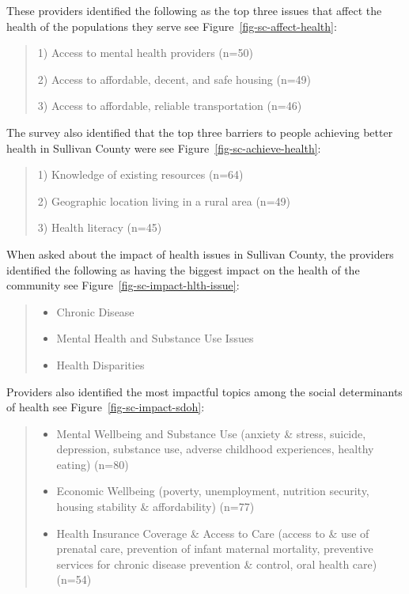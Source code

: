 \documentclass[
  english,
  letterpaper,
]{report}
\begin{document}
These providers identified the following as the top three issues that
affect the health of the populations they serve see
Figure~\ref{fig-sc-affect-health}:

\begin{quote}
1) Access to mental health providers (n=50)

2) Access to affordable, decent, and safe housing (n=49)

3) Access to affordable, reliable transportation (n=46)
\end{quote}

The survey also identified that the top three barriers to people
achieving better health in Sullivan County were see
Figure~\ref{fig-sc-achieve-health}:

\begin{quote}
1) Knowledge of existing resources (n=64)

2) Geographic location living in a rural area (n=49)

3) Health literacy (n=45)
\end{quote}

When asked about the impact of health issues in Sullivan County, the
providers identified the following as having the biggest impact on the
health of the community see Figure~\ref{fig-sc-impact-hlth-issue}:

\begin{quote}
\begin{itemize}
\item
  Chronic Disease
\item
  Mental Health and Substance Use Issues
\item
  Health Disparities
\end{itemize}
\end{quote}

Providers also identified the most impactful topics among the social
determinants of health see Figure~\ref{fig-sc-impact-sdoh}:

\begin{quote}
\begin{itemize}
\item
  Mental Wellbeing and Substance Use (anxiety \& stress, suicide,
  depression, substance use, adverse childhood experiences, healthy
  eating) (n=80)
\item
  Economic Wellbeing (poverty, unemployment, nutrition security, housing
  stability \& affordability) (n=77)
\item
  Health Insurance Coverage \& Access to Care (access to \& use of
  prenatal care, prevention of infant maternal mortality, preventive
  services for chronic disease prevention \& control, oral health care)
  (n=54)
\end{itemize}
\end{quote}
\end{document}
